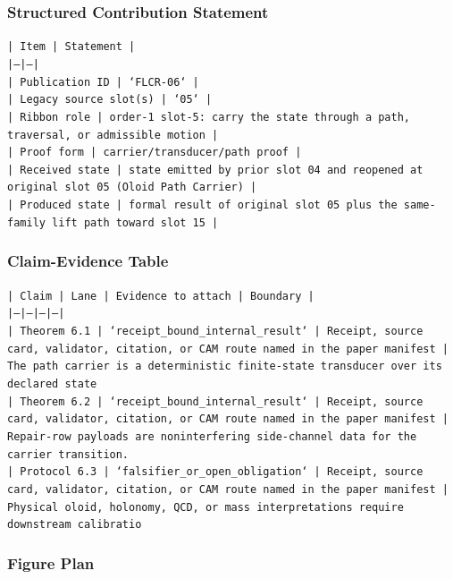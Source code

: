 \documentclass[11pt]{article}
\begin{document}
\subsubsection*{Structured Contribution Statement}

\noindent\texttt{| Item | Statement |}\\
\noindent\texttt{|---|---|}\\
\noindent\texttt{| Publication ID | `FLCR-06` |}\\
\noindent\texttt{| Legacy source slot(s) | `05` |}\\
\noindent\texttt{| Ribbon role | order-1 slot-5: carry the state through a path, traversal, or admissible motion |}\\
\noindent\texttt{| Proof form | carrier/transducer/path proof |}\\
\noindent\texttt{| Received state | state emitted by prior slot 04 and reopened at original slot 05 (Oloid Path Carrier) |}\\
\noindent\texttt{| Produced state | formal result of original slot 05 plus the same-family lift path toward slot 15 |}\\

\subsubsection*{Claim-Evidence Table}

\noindent\texttt{| Claim | Lane | Evidence to attach | Boundary |}\\
\noindent\texttt{|---|---|---|---|}\\
\noindent\texttt{| Theorem 6.1 | `receipt\_bound\_internal\_result` | Receipt, source card, validator, citation, or CAM route named in the paper manifest | The path carrier is a deterministic finite-state transducer over its declared state }\\
\noindent\texttt{| Theorem 6.2 | `receipt\_bound\_internal\_result` | Receipt, source card, validator, citation, or CAM route named in the paper manifest | Repair-row payloads are noninterfering side-channel data for the carrier transition.}\\
\noindent\texttt{| Protocol 6.3 | `falsifier\_or\_open\_obligation` | Receipt, source card, validator, citation, or CAM route named in the paper manifest | Physical oloid, holonomy, QCD, or mass interpretations require downstream calibratio}\\

\subsubsection*{Figure Plan}
\end{document}
